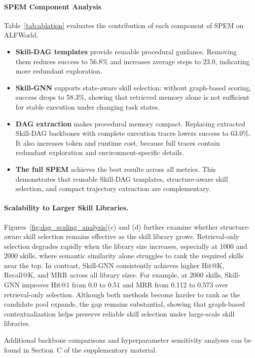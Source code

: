 \documentclass[letterpaper]{article} %
\newcommand{\model}{\textsc{SPEM}}
\begin{document}
\paragraph{\model{} Component Analysis}
Table~\ref{tab:ablation} evaluates the contribution of each component of \model{} on ALFWorld. 
\begin{itemize}
  \item \textbf{Skill-DAG templates} provide reusable procedural guidance. Removing them reduces success to 56.8\% and increases average steps to 23.0, indicating more redundant exploration. 
  \item \textbf{Skill-GNN} supports state-aware skill selection: without graph-based scoring, success drops to 58.3\%, showing that retrieved memory alone is not sufficient for stable execution under changing task states. 
  \item \textbf{DAG extraction} makes procedural memory compact. Replacing extracted Skill-DAG backbones with complete execution traces lowers success to 63.0\%. It also increases token and runtime cost, because full traces contain redundant exploration and environment-specific details. 
  \item \textbf{The full \model{}} achieves the best results across all metrics. This demonstrates that reusable Skill-DAG templates, structure-aware skill selection, and compact trajectory extraction are complementary.
\end{itemize}

\paragraph{Scalability to Larger Skill Libraries.}
Figures~\ref{fig:dag_scaling_analysis}(c) and (d) further examine whether structure-aware skill selection remains effective as the skill library grows. Retrieval-only selection degrades rapidly when the library size increases, especially at 1000 and 2000 skills, where semantic similarity alone struggles to rank the required skills near the top. In contrast, Skill-GNN consistently achieves higher Hit@K, Recall@K, and MRR across all library sizes. For example, at 2000 skills, Skill-GNN improves Hit@1 from 0.0 to 0.51 and MRR from 0.112 to 0.573 over retrieval-only selection. Although both methods become harder to rank as the candidate pool expands, the gap remains substantial, showing that graph-based contextualization helps preserve reliable skill selection under large-scale skill libraries.

Additional backbone comparisons and hyperparameter sensitivity analyses can be found in Section~C of the supplementary material.
\end{document}
